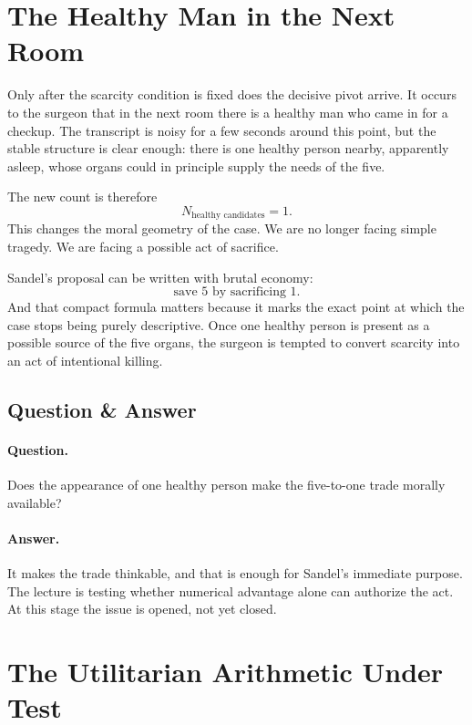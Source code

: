 \section{The Healthy Man in the Next Room}

Only after the scarcity condition is fixed does the decisive pivot arrive. It occurs to the surgeon that in the next room there is a healthy man who came in for a checkup. The transcript is noisy for a few seconds around this point, but the stable structure is clear enough: there is one healthy person nearby, apparently asleep, whose organs could in principle supply the needs of the five.

The new count is therefore
\begin{equation}
N_{\text{healthy candidates}} = 1.
\end{equation}
This changes the moral geometry of the case. We are no longer facing simple tragedy. We are facing a possible act of sacrifice.

Sandel's proposal can be written with brutal economy:
\begin{equation}
\text{save }5\text{ by sacrificing }1.
\end{equation}
And that compact formula matters because it marks the exact point at which the case stops being purely descriptive. Once one healthy person is present as a possible source of the five organs, the surgeon is tempted to convert scarcity into an act of intentional killing.

\subsection{Question \& Answer}

\paragraph{Question.} Does the appearance of one healthy person make the five-to-one trade morally available?

\paragraph{Answer.} It makes the trade thinkable, and that is enough for Sandel's immediate purpose. The lecture is testing whether numerical advantage alone can authorize the act. At this stage the issue is opened, not yet closed.

\section{The Utilitarian Arithmetic Under Test}

